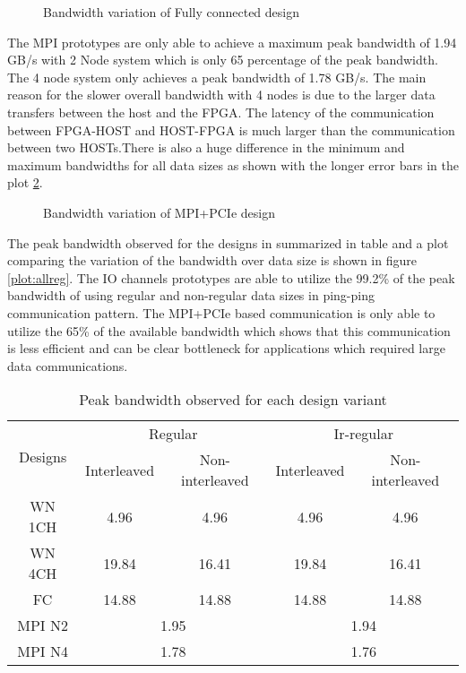 \begin{figure}[ht]
    \centering
    \scalebox{0.8}{}
    \caption{Bandwidth variation of Fully connected design}
    \label{plot:fc}
\end{figure}


The MPI prototypes are only able to achieve a maximum peak bandwidth of 1.94 GB/s with 2 Node system
which is only 65 percentage of the peak bandwidth. The 4 node system only achieves a peak bandwidth of
1.78 GB/s. The main reason for the slower overall bandwidth with 4 nodes is due to the larger
data transfers between the host and the FPGA. The latency of the communication between FPGA-HOST
and HOST-FPGA is much larger than the communication between two HOSTs.There is also a huge difference
in the minimum and maximum bandwidths for all data sizes as shown with the longer error bars in the
plot \ref{plot:mpipcie}.

\begin{figure}[ht]
    \centering
    \scalebox{0.8}{}
    \caption{Bandwidth variation of MPI+PCIe design}
    \label{plot:mpipcie}
\end{figure}

The peak bandwidth observed for the designs in summarized in table and a plot comparing the variation
of the bandwidth over data size is shown in figure \ref{plot:allreg}. The IO channels prototypes are able
to utilize the 99.2\% of the peak bandwidth of using regular and non-regular data sizes in ping-ping
communication pattern. The MPI+PCIe based communication is only able to utilize the 65\% of the available
bandwidth which shows that this communication is less efficient and can be clear bottleneck for applications
which required large data communications.
\begin{table}[ht]
    \centering
    \begin{tabular}{ccccc}
    \multicolumn{1}{c}{\multirow{2}{*}{Designs}} & \multicolumn{2}{c}{Regular} & \multicolumn{2}{c}{Ir-regular} \\ \cline{2-5}
    \multicolumn{1}{c}{} & Interleaved & \multicolumn{1}{c}{Non-interleaved} & Interleaved & \multicolumn{1}{c}{Non-interleaved} \\ \hline
    WN 1CH & \multicolumn{1}{c}{4.96} & 4.96 & \multicolumn{1}{c}{4.96} & 4.96 \\ \hline
    WN 4CH & \multicolumn{1}{c}{19.84} & 16.41 & \multicolumn{1}{c}{19.84} & 16.41 \\ \hline
    FC & \multicolumn{1}{c}{14.88} & 14.88 & \multicolumn{1}{c}{14.88} & 14.88 \\ \hline
    MPI N2 & \multicolumn{2}{c}{1.95} & \multicolumn{2}{c}{1.94} \\ \hline
    MPI N4 & \multicolumn{2}{c}{1.78} & \multicolumn{2}{c}{1.76} \\ \hline
    \end{tabular}%
    \caption{Peak bandwidth observed for each design variant}
    \label{tab:obs_peakbw}
\end{table}


